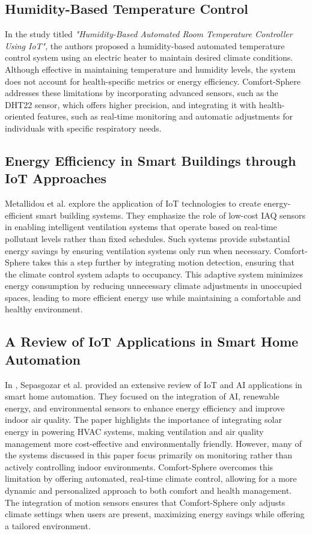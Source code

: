 \documentclass[a4paper]{scrartcl}
\begin{document}
	\subsection{Humidity-Based Temperature Control}
	In the study \cite{paper1} titled \textit{"Humidity-Based Automated Room Temperature Controller Using IoT"}, the authors proposed a humidity-based automated temperature control system using an electric heater to maintain desired climate conditions. Although effective in maintaining temperature and humidity levels, the system does not account for health-specific metrics or energy efficiency. Comfort-Sphere addresses these limitations by incorporating advanced sensors, such as the DHT22 sensor, which offers higher precision, and integrating it with health-oriented features, such as real-time monitoring and automatic adjustments for individuals with specific respiratory needs.

	\subsection{Energy Efficiency in Smart Buildings through IoT Approaches}
	Metallidou et al. \cite{paper2} explore the application of IoT technologies to create energy-efficient smart building systems. They emphasize the role of low-cost IAQ sensors in enabling intelligent ventilation systems that operate based on real-time pollutant levels rather than fixed schedules. Such systems provide substantial energy savings by ensuring ventilation systems only run when necessary. Comfort-Sphere takes this a step further by integrating motion detection, ensuring that the climate control system adapts to occupancy. This adaptive system minimizes energy consumption by reducing unnecessary climate adjustments in unoccupied spaces, leading to more efficient energy use while maintaining a comfortable and healthy environment.

	\subsection{A Review of IoT Applications in Smart Home Automation}
	In \cite{paper3}, Sepasgozar et al. provided an extensive review of IoT and AI applications in smart home automation. They focused on the integration of AI, renewable energy, and environmental sensors to enhance energy efficiency and improve indoor air quality. The paper highlights the importance of integrating solar energy in powering HVAC systems, making ventilation and air quality management more cost-effective and environmentally friendly. However, many of the systems discussed in this paper focus primarily on monitoring rather than actively controlling indoor environments. Comfort-Sphere overcomes this limitation by offering automated, real-time climate control, allowing for a more dynamic and personalized approach to both comfort and health management. The integration of motion sensors ensures that Comfort-Sphere only adjusts climate settings when users are present, maximizing energy savings while offering a tailored environment.
\end{document}
